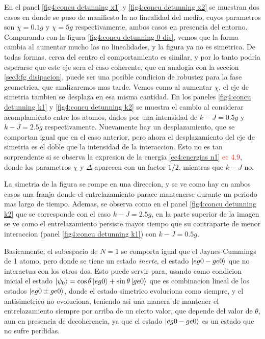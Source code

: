 En el panel \ref{fig4:concu detunning x1} y \ref{fig4:concu detunning x2} se muestran dos casos en donde se puso de manifiesto la no linealidad del medio, cuyos parametros son $\chi=0.1g$ y $\chi=5g$ respectivamente, ambos casos en presencia del entorno. Comparando con la figura \ref{fig4:concu detunning 0 dis}, vemos que la forma cambia al aumentar mucho las no linealidades, y la figura ya no es simetrica. De todas formas, cerca del centro el comportamiento es similar, y por lo tanto podria esperarse que este eje sera el caso coherente, que en analogia con la seccion \ref{sec3:fg disipacion}, puede ser una posible condicion de robustez para la fase geometrica, que analizaremos mas tarde. Vemos como al aumentar $\chi$, el eje de simetria tambien se desplaza en esa misma cantidad. En los paneles \ref{fig4:concu detunning k1} y \ref{fig4:concu detunning k2} se muestra el cambio al considerar acomplamiento entre los atomos, dados por una intensidad de $k-J=0.5g$ y $k-J=2.5g$ respectivamente. Nuevamente hay un desplazamiento, que se comportan igual que en el caso anterior, pero ahora el desplazamiento del eje de simetria es el doble que la intensidad de la interaccion. Esto no es tan sorprendente si se observa la expresion de la energia \ref{ec4:energias n1} \textcolor{red}{ec 4.9}, donde los parametros $\chi$ y $\Delta$ aparecen con un factor $1/2$, mientras que $k-J$ no. 

La simetria de la figura se rompe en una direccion, y se ve como hay en ambos casos una franja donde el entrelazamiento parace mantenerse durante un periodo mas largo de tiempo. Ademas, se observa como en el panel \ref{fig4:concu detunning k2} que se corresponde con el caso $k-J=2.5g$, en la parte superior de la imagen se ve como el entrelazamiento persiste mayor tiempo que su contraparte de menor interaccion (panel \ref{fig4:concu detunning k1}) con $k-J=0.5g$.

Basicamente, el subespacio de $N=1$ se comporta igual que el Jaynes-Cummings de 1 atomo, pero donde se tiene un estado \textit{inerte}, el estado $\ket{eg0-ge0}$ que no interactua con los otros dos. Esto puede servir para, usando como condicion inicial el estado $\ket{\psi_0}=\cos\theta\ket{eg0}+\sin\theta\ket{ge0}$ que es combinacion lineal de los estados $\ket{eg0\pm ge0}$, donde el estado simetrico evoluciona como siempre, y el antisimetrico no evoluciona, teniendo asi una manera de mantener el entrelazamiento siempre por arriba de un cierto valor, que depende del valor de $\theta$, aun en presencia de decoherencia, ya que el estado $\ket{eg0-ge0}$ es un estado que no sufre perdidas.

